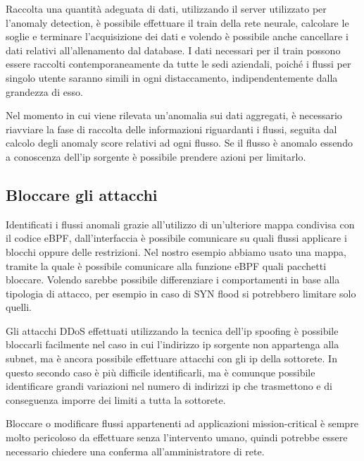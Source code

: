 Raccolta una quantità adeguata di dati, utilizzando il server utilizzato per l'anomaly detection, è possibile effettuare il train della rete neurale, calcolare le soglie e terminare l'acquisizione dei dati e volendo è possibile anche cancellare i dati relativi all'allenamento dal database. I dati necessari per il train possono essere raccolti contemporaneamente da tutte le sedi aziendali, poiché i flussi per singolo utente saranno simili in ogni distaccamento, indipendentemente dalla grandezza di esso.

Nel momento in cui viene rilevata un'anomalia sui dati aggregati, è necessario riavviare la fase di raccolta delle informazioni riguardanti i flussi, seguita dal calcolo degli anomaly score relativi ad ogni flusso. Se il flusso è anomalo essendo a conoscenza dell'ip sorgente è possibile prendere azioni per limitarlo.


\subsection{Bloccare gli attacchi}

Identificati i flussi anomali grazie all'utilizzo di un'ulteriore mappa condivisa con il codice eBPF, dall'interfaccia è possibile comunicare su quali flussi applicare i blocchi oppure delle restrizioni.
Nel nostro esempio abbiamo usato una mappa, tramite la quale è possibile comunicare alla funzione eBPF quali pacchetti bloccare. Volendo sarebbe possibile differenziare i comportamenti in base alla tipologia di attacco, per esempio in caso di SYN flood si potrebbero limitare solo quelli.

Gli attacchi DDoS effettuati utilizzando la tecnica dell'ip spoofing è possibile bloccarli facilmente nel caso in cui l'indirizzo ip sorgente non appartenga alla subnet, ma è ancora possibile effettuare attacchi con gli ip della sottorete.
In questo secondo caso è più difficile identificarli, ma è comunque possibile identificare grandi variazioni nel numero di indirizzi ip che trasmettono e di conseguenza imporre dei limiti a tutta la sottorete.

Bloccare o modificare flussi appartenenti ad applicazioni mission-critical è sempre molto pericoloso da effettuare senza l'intervento umano, quindi potrebbe essere necessario chiedere una conferma all'amministratore di rete.




